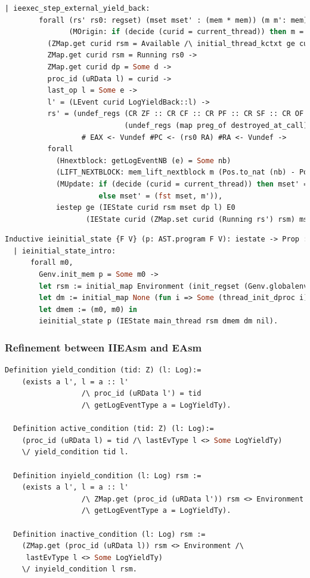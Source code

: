 \begin{lstlisting}[language=Caml]
    | ieexec_step_external_yield_back:
        forall (rs' rs0: regset) (mset mset' : (mem * mem)) (m m': mem) curid rsm l l' nb dp d e
               (MOrigin: if (decide (curid = current_thread)) then m = fst mset else m = snd mset),
          (ZMap.get curid rsm = Available /\ initial_thread_kctxt ge curid l = Some rs0) \/
          ZMap.get curid rsm = Running rs0 ->
          ZMap.get curid dp = Some d ->
          proc_id (uRData l) = curid ->
          last_op l = Some e ->
          l' = (LEvent curid LogYieldBack::l) ->
          rs' = (undef_regs (CR ZF :: CR CF :: CR PF :: CR SF :: CR OF :: nil)
                            (undef_regs (map preg_of destroyed_at_call) rs0)) 
                  # EAX <- Vundef #PC <- (rs0 RA) #RA <- Vundef ->
          forall
            (Hnextblock: getLogEventNB (e) = Some nb)
            (LIFT_NEXTBLOCK: mem_lift_nextblock m (Pos.to_nat (nb) - Pos.to_nat (Mem.nextblock m) % nat) = m')
            (MUpdate: if (decide (curid = current_thread)) then mset' = (m', snd mset) 
                      else mset' = (fst mset, m')),
            iestep ge (IEState curid rsm mset dp l) E0
                   (IEState curid (ZMap.set curid (Running rs') rsm) mset' dp l').

\end{lstlisting}

\begin{lstlisting}[language=Caml]
  Inductive ieinitial_state {F V} (p: AST.program F V): iestate -> Prop :=
  | ieinitial_state_intro: 
      forall m0,
        Genv.init_mem p = Some m0 ->
        let rsm := initial_map Environment (init_regset (Genv.globalenv p)) active_threads in
        let dm := initial_map None (fun i => Some (thread_init_dproc i)) active_threads in
        let dmem := (m0, m0) in
        ieinitial_state p (IEState main_thread rsm dmem dm nil).
\end{lstlisting}

\subsubsection{Refinement between IIEAsm and EAsm}
\begin{lstlisting}[language=Caml]
  Definition yield_condition (tid: Z) (l: Log):=
    (exists a l', l = a :: l'
                  /\ proc_id (uRData l') = tid
                  /\ getLogEventType a = LogYieldTy).

  Definition active_condition (tid: Z) (l: Log):=
    (proc_id (uRData l) = tid /\ lastEvType l <> Some LogYieldTy)
    \/ yield_condition tid l.

  Definition inyield_condition (l: Log) rsm :=
    (exists a l', l = a :: l' 
                  /\ ZMap.get (proc_id (uRData l')) rsm <> Environment
                  /\ getLogEventType a = LogYieldTy).

  Definition inactive_condition (l: Log) rsm :=
    (ZMap.get (proc_id (uRData l)) rsm <> Environment /\
     lastEvType l <> Some LogYieldTy)
    \/ inyield_condition l rsm.
\end{lstlisting}

